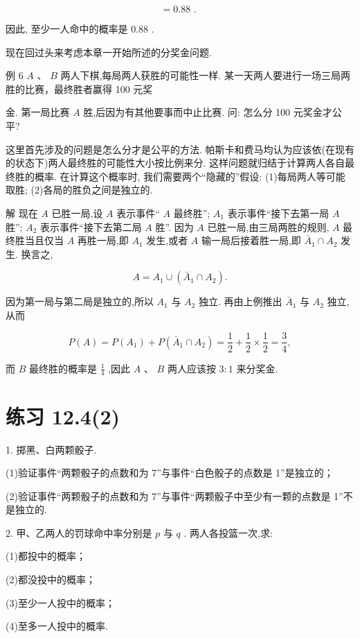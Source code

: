 \documentclass[10pt]{article}
\begin{document}
\[
= {0.88}\text{ . }
\]

因此, 至少一人命中的概率是 0.88 .

现在回过头来考虑本章一开始所述的分奖金问题.

例 6 \(A\text{ 、 }B\) 两人下棋,每局两人获胜的可能性一样. 某一天两人要进行一场三局两胜的比赛，最终胜者赢得 100 元奖

金. 第一局比赛 \(A\) 胜,后因为有其他要事而中止比赛. 问: 怎么分 100 元奖金才公平?

这里首先涉及的问题是怎么分才是公平的方法. 帕斯卡和费马均认为应该依(在现有的状态下)两人最终胜的可能性大小按比例来分. 这样问题就归结于计算两人各自最终胜的概率. 在计算这个概率时, 我们需要两个“隐藏的”假设: (1)每局两人等可能取胜; (2)各局的胜负之间是独立的.

解 现在 \(A\) 已胜一局,设 \(A\) 表示事件“ \(A\) 最终胜”; \({A}_{1}\) 表示事件“接下去第一局 \(A\) 胜”; \({A}_{2}\) 表示事件“接下去第二局 \(A\) 胜”. 因为 \(A\) 已胜一局,由三局两胜的规则, \(A\) 最终胜当且仅当 \(A\) 再胜一局,即 \({A}_{1}\) 发生,或者 \(A\) 输一局后接着胜一局,即 \({\bar{A}}_{1} \cap  {A}_{2}\) 发生. 换言之,

\[
A = {A}_{1} \cup  \left( {{\bar{A}}_{1} \cap  {A}_{2}}\right) .
\]

因为第一局与第二局是独立的,所以 \({A}_{1}\) 与 \({A}_{2}\) 独立. 再由上例推出 \({\bar{A}}_{1}\) 与 \({A}_{2}\) 独立,从而

\[
P\left( A\right)  = P\left( {A}_{1}\right)  + P\left( {{\bar{A}}_{1} \cap  {A}_{2}}\right)  = \frac{1}{2} + \frac{1}{2} \times  \frac{1}{2} = \frac{3}{4},
\]

而 \(B\) 最终胜的概率是 \(\frac{1}{4}\) ,因此 \(A\text{ 、 }B\) 两人应该按 \(3 : 1\) 来分奖金.

\section*{练习 12.4(2)}

1. 掷黑、白两颗骰子.

(1)验证事件“两颗骰子的点数和为 7”与事件“白色骰子的点数是 1”是独立的；

(2)验证事件“两颗骰子的点数和为 7”与事件“两颗骰子中至少有一颗的点数是 1”不是独立的.

2. 甲、乙两人的罚球命中率分别是 \(p\) 与 \(q\) . 两人各投篮一次,求:

(1)都投中的概率；

(2)都没投中的概率；

(3)至少一人投中的概率；

(4)至多一人投中的概率.
\end{document}

